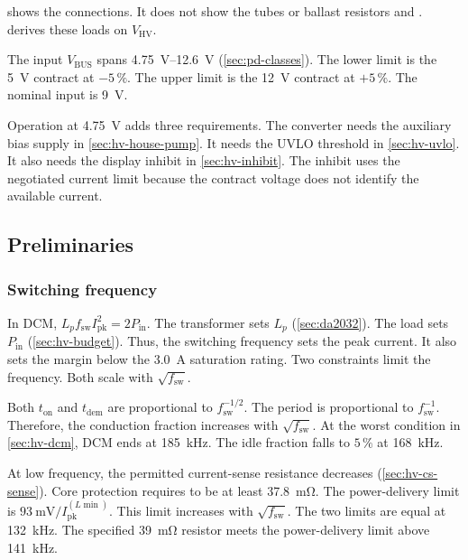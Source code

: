  shows the connections. It does not show the tubes or ballast
resistors  and .  derives these
loads on $V_{\mathrm{HV}}$.

The input $V_{\mathrm{BUS}}$ spans \SIrange{4.75}{12.6}{\volt}
(\cref{sec:pd-classes}). The lower limit is the \SI{5}{\volt} contract at
$-5\,\%$. The upper limit is the \SI{12}{\volt} contract at $+5\,\%$. The
nominal input is \SI{9}{\volt}.

Operation at \SI{4.75}{\volt} adds three requirements. The converter needs the
auxiliary bias supply in \cref{sec:hv-house-pump}. It needs the UVLO threshold
in \cref{sec:hv-uvlo}. It also needs the display inhibit in
\cref{sec:hv-inhibit}. The inhibit uses the negotiated current limit because
the contract voltage does not identify the available current.

\subsection{Preliminaries}\label{sec:hv-prelim}

\subsubsection{Switching frequency}\label{sec:hv-fsw-choice}

In DCM, $L_p f_{\mathrm{sw}} I_{\mathrm{pk}}^2 = 2 P_{\mathrm{in}}$. The
transformer sets $L_p$ (\cref{sec:da2032}). The load sets $P_{\mathrm{in}}$
(\cref{sec:hv-budget}). Thus, the switching frequency sets the peak current.
It also sets the margin below the \SI{3.0}{\ampere} saturation rating. Two
constraints limit the frequency. Both scale with $\sqrt{f_{\mathrm{sw}}}$.

Both $t_{\mathrm{on}}$ and $t_{\mathrm{dem}}$ are proportional to
$f_{\mathrm{sw}}^{-1/2}$. The period is proportional to
$f_{\mathrm{sw}}^{-1}$. Therefore, the conduction fraction increases with
$\sqrt{f_{\mathrm{sw}}}$. At the worst condition in \cref{sec:hv-dcm}, DCM
ends at \SI{185}{\kilo\hertz}. The idle fraction falls to $5\,\%$ at
\SI{168}{\kilo\hertz}.

At low frequency, the permitted current-sense resistance decreases
(\cref{sec:hv-cs-sense}). Core protection requires  to be at least
\SI{37.8}{\milli\ohm}. The power-delivery limit is
$\SI{93}{\milli\volt}/I_{\mathrm{pk}}^{(L\min)}$. This limit increases with
$\sqrt{f_{\mathrm{sw}}}$. The two limits are equal at
\SI{132}{\kilo\hertz}. The specified \SI{39}{\milli\ohm} resistor meets the
power-delivery limit above \SI{141}{\kilo\hertz}.

